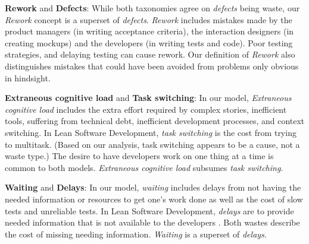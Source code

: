 


\textbf{Rework} and \textbf{Defects}: While both taxonomies agree on \textit{defects} being waste, our \textit{Rework} concept is a superset of \textit{defects}. \textit{Rework} includes mistakes made by the product managers (in writing acceptance criteria), the interaction designers (in creating mockups) and the developers (in writing tests and code). Poor testing strategies, and delaying testing can cause rework. Our definition of \textit{Rework} also distinguishes mistakes that could have been avoided from problems only obvious in hindsight. 

\textbf{Extraneous cognitive load} and \textbf{Task switching}: In our model, \textit{Extraneous cognitive load} includes the extra effort required by complex stories,  inefficient tools, suffering from technical debt, inefficient development processes, and context switching. In Lean Software Development, \textit{task switching} is the cost from trying to multitask. (Based on our analysis, task switching appears to be a cause, not a waste type.) The desire to have developers work on one thing at a time is common to both models. \textit{Extraneous cognitive load} subsumes \textit{task switching}. 

\textbf{Waiting} and \textbf{Delays}: In our model, \textit{waiting} includes delays from not having the needed information or resources to get one's work done as well as the cost of slow tests and unreliable tests. In Lean Software Development, \textit{delays} are  to provide needed information that is not available to the developers \cite{PoppendieckConceptToCash}. Both wastes describe the cost of missing needing information. \textit{Waiting} is a superset of \textit{delays}.

